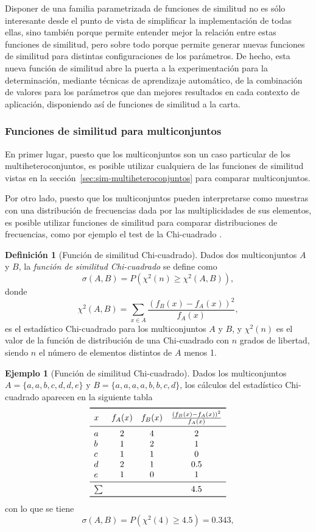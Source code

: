 \documentclass[a4paper,10pt,twoside]{article}
\theoremstyle{definition}
\newtheorem{definition}{Definición}
\newtheorem{example}{Ejemplo}
\begin{document}
Disponer de una familia parametrizada de funciones de similitud no es sólo interesante desde el punto de vista de simplificar la implementación de todas ellas, sino también porque permite entender mejor la relación entre estas funciones de similitud, pero sobre todo porque permite generar nuevas funciones de similitud para distintas configuraciones de los parámetros. 
De hecho, esta nueva función de similitud abre la puerta a la experimentación para la determinación, mediante técnicas de aprendizaje automático, de la combinación de valores para los parámetros que dan mejores resultados en cada contexto de aplicación, disponiendo así de funciones de similitud a la carta. 

\subsubsection{Funciones de similitud para multiconjuntos}
\label{sec:sim-multiconjuntos}

En primer lugar, puesto que los multiconjuntos son un caso particular de los multiheteroconjuntos, es posible utilizar cualquiera de las funciones de similitud vistas en la sección~\ref{sec:sim-multiheteroconjuntos} para comparar multiconjuntos.

Por otro lado, puesto que los multiconjuntos pueden interpretarse como muestras con una distribución de frecuencias dada por las
multiplicidades de sus elementos, es posible utilizar funciones de similitud para comparar distribuciones de frecuencias, como por
ejemplo el test de la Chi-cuadrado \cite{manning1999foundations}.

\begin{definition}[Función de similitud Chi-cuadrado]
Dados dos multiconjuntos $A$ y $B$, la \emph{función de similitud Chi-cuadrado} se define como
\[
\sigma(A,B) = P(\chi^2(n)\geq \chi^2(A,B)),
\]
donde
\[
\chi^2(A,B)=\sum_{x\in A} \frac{(f_B(x)-f_A(x))^2}{f_A(x)},
\]
es el estadístico Chi-cuadrado para los multiconjuntos $A$ y $B$, y $\chi^2(n)$ es el valor de la función de distribución de una Chi-cuadrado con $n$ grados de libertad, siendo $n$ el número de elementos distintos de $A$ menos 1.
\end{definition}

\begin{example}[Función de similitud Chi-cuadrado]
Dados los multiconjuntos $A=\{a,a,b,\allowbreak c,d,d,e\}$ y $B=\{a,a,a,a,b,b,c,d\}$, los cálculos del estadístico Chi-cuadrado aparecen en la siguiente tabla 
\[
\begin{array}{lccc}
\toprule
x & f_A(x) & f_B(x) & \frac{(f_B(x)-f_A(x))^2}{f_A(x)} \\
\midrule
a & 2 & 4 & 2\\
b & 1 & 2 & 1\\
c & 1 & 1 & 0\\
d & 2 & 1 & 0.5 \\
e & 1 & 0 & 1\\
\midrule
\sum & & & 4.5\\
\bottomrule
\end{array}
\]
con lo que se tiene
\[
\sigma(A,B) = P(\chi^2(4)\geq 4.5) = 0.343,
\]
\end{example}
\end{document}
